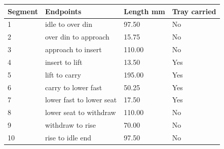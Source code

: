 \begin{tabular}{llll}
\toprule
Segment & Endpoints & Length mm & Tray carried \\
\midrule
1 & idle to over din & 97.50 & No \\
2 & over din to approach & 15.75 & No \\
3 & approach to insert & 110.00 & No \\
4 & insert to lift & 13.50 & Yes \\
5 & lift to carry & 195.00 & Yes \\
6 & carry to lower fast & 50.25 & Yes \\
7 & lower fast to lower seat & 17.50 & Yes \\
8 & lower seat to withdraw & 110.00 & No \\
9 & withdraw to rise & 70.00 & No \\
10 & rise to idle end & 97.50 & No \\
\bottomrule
\end{tabular}
